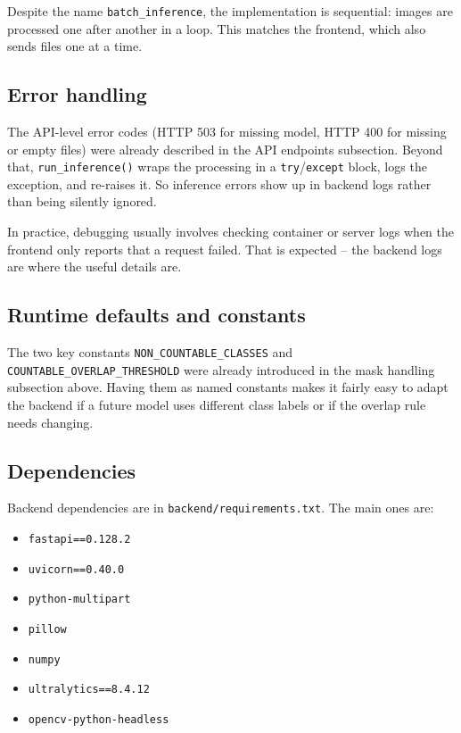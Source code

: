\documentclass{article}
\begin{document}
Despite the name \texttt{batch\_inference}, the implementation is sequential: images are processed one after another in a loop. This matches the frontend, which also sends files one at a time.

\subsection{Error handling}

The API-level error codes (HTTP 503 for missing model, HTTP 400 for missing or empty files) were already described in the API endpoints subsection. Beyond that, \texttt{run\_inference()} wraps the processing in a \texttt{try}/\texttt{except} block, logs the exception, and re-raises it. So inference errors show up in backend logs rather than being silently ignored.

In practice, debugging usually involves checking container or server logs when the frontend only reports that a request failed. That is expected -- the backend logs are where the useful details are.

\subsection{Runtime defaults and constants}

The two key constants \texttt{NON\_COUNTABLE\_CLASSES} and \texttt{COUNTABLE\_OVERLAP\_THRESHOLD} were already introduced in the mask handling subsection above. Having them as named constants makes it fairly easy to adapt the backend if a future model uses different class labels or if the overlap rule needs changing.

\subsection{Dependencies}

Backend dependencies are in \texttt{backend/requirements.txt}. The main ones are:

\begin{itemize}
    \item \texttt{fastapi==0.128.2}
    \item \texttt{uvicorn==0.40.0}
    \item \texttt{python-multipart}
    \item \texttt{pillow}
    \item \texttt{numpy}
    \item \texttt{ultralytics==8.4.12}
    \item \texttt{opencv-python-headless}
\end{itemize}
\end{document}
